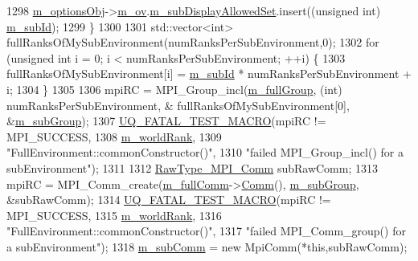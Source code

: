 \begin{DoxyCode}
{1298     \hyperlink{class_q_u_e_s_o_1_1_base_environment_aa91c7ac0ab11472bafb0ae4ac36d2194}{m\_optionsObj}->\hyperlink{class_q_u_e_s_o_1_1_environment_options_a97de0e8029b2d567643ab2b1b6ba2b9c}{m\_ov}.\hyperlink{class_q_u_e_s_o_1_1_env_options_values_afd2f167d8f568df84b3efe5df4430ee3}{m\_subDisplayAllowedSet}.insert((\textcolor{keywordtype}{unsigned} \textcolor{keywordtype}{int}) 
      \hyperlink{class_q_u_e_s_o_1_1_base_environment_a2aea4a26ea39e72300f7c32594c26012}{m\_subId});
1299   \}
1300 
1301   std::vector<int> fullRanksOfMySubEnvironment(numRanksPerSubEnvironment,0);
1302   \textcolor{keywordflow}{for} (\textcolor{keywordtype}{unsigned} \textcolor{keywordtype}{int} i = 0; i < numRanksPerSubEnvironment; ++i) \{
1303     fullRanksOfMySubEnvironment[i] = \hyperlink{class_q_u_e_s_o_1_1_base_environment_a2aea4a26ea39e72300f7c32594c26012}{m\_subId} * numRanksPerSubEnvironment + i;
1304   \}
1305 
1306   mpiRC = MPI\_Group\_incl(\hyperlink{class_q_u_e_s_o_1_1_base_environment_ad455ca08c81b8d953e9a8d2bb14d03c3}{m\_fullGroup}, (\textcolor{keywordtype}{int}) numRanksPerSubEnvironment, &
      fullRanksOfMySubEnvironment[0], &\hyperlink{class_q_u_e_s_o_1_1_base_environment_a6669dac8fb884d4eb3278625f0e8d661}{m\_subGroup});
1307   \hyperlink{_defines_8h_a56d63d18d0a6d45757de47fcc06f574d}{UQ\_FATAL\_TEST\_MACRO}(mpiRC != MPI\_SUCCESS,
1308                       \hyperlink{class_q_u_e_s_o_1_1_base_environment_a464cab923ada0e14c6e3a4000c2ea385}{m\_worldRank},
1309                       \textcolor{stringliteral}{"FullEnvironment::commonConstructor()"},
1310                       \textcolor{stringliteral}{"failed MPI\_Group\_incl() for a subEnvironment"});
1311 
1312   \hyperlink{namespace_q_u_e_s_o_af48741a7e6d7897e9e96e0f5bb26cfd7}{RawType\_MPI\_Comm} subRawComm;
1313   mpiRC = MPI\_Comm\_create(\hyperlink{class_q_u_e_s_o_1_1_base_environment_a8e80c9067b0875c419f1b9ecccbdb46d}{m\_fullComm}->\hyperlink{class_q_u_e_s_o_1_1_mpi_comm_a29d53c01c5ac7ba1bb3a33911d89b6b8}{Comm}(), \hyperlink{class_q_u_e_s_o_1_1_base_environment_a6669dac8fb884d4eb3278625f0e8d661}{m\_subGroup}, &subRawComm);
1314   \hyperlink{_defines_8h_a56d63d18d0a6d45757de47fcc06f574d}{UQ\_FATAL\_TEST\_MACRO}(mpiRC != MPI\_SUCCESS,
1315                       \hyperlink{class_q_u_e_s_o_1_1_base_environment_a464cab923ada0e14c6e3a4000c2ea385}{m\_worldRank},
1316                       \textcolor{stringliteral}{"FullEnvironment::commonConstructor()"},
1317                       \textcolor{stringliteral}{"failed MPI\_Comm\_group() for a subEnvironment"});
1318   \hyperlink{class_q_u_e_s_o_1_1_base_environment_ac8d7b6062d9a58ef1a36eb95753498b4}{m\_subComm} = \textcolor{keyword}{new} MpiComm(*\textcolor{keyword}{this},subRawComm);
}
\end{DoxyCode}
